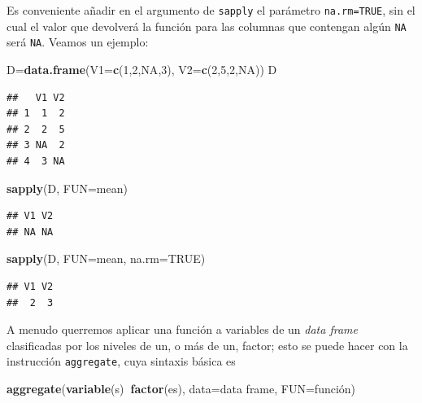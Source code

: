 \documentclass[]{book}
\newenvironment{Shaded}{\begin{snugshade}}{\end{snugshade}}
\newcommand{\DataTypeTok}[1]{\textcolor[rgb]{0.13,0.29,0.53}{#1}}
\newcommand{\DecValTok}[1]{\textcolor[rgb]{0.00,0.00,0.81}{#1}}
\newcommand{\KeywordTok}[1]{\textcolor[rgb]{0.13,0.29,0.53}{\textbf{#1}}}
\newcommand{\NormalTok}[1]{#1}
\newcommand{\OperatorTok}[1]{\textcolor[rgb]{0.81,0.36,0.00}{\textbf{#1}}}
\newcommand{\OtherTok}[1]{\textcolor[rgb]{0.56,0.35,0.01}{#1}}
\theoremstyle{definition}
\theoremstyle{definition}
\theoremstyle{definition}
\theoremstyle{remark}
\begin{document}
Es conveniente añadir en el argumento de \texttt{sapply} el parámetro \texttt{na.rm=TRUE}, sin el cual el valor que devolverá la función para las columnas que contengan algún \texttt{NA} será \texttt{NA}. Veamos un ejemplo:

\begin{Shaded}
\begin{Highlighting}[]
\NormalTok{D=}\KeywordTok{data.frame}\NormalTok{(}\DataTypeTok{V1=}\KeywordTok{c}\NormalTok{(}\DecValTok{1}\NormalTok{,}\DecValTok{2}\NormalTok{,}\OtherTok{NA}\NormalTok{,}\DecValTok{3}\NormalTok{), }\DataTypeTok{V2=}\KeywordTok{c}\NormalTok{(}\DecValTok{2}\NormalTok{,}\DecValTok{5}\NormalTok{,}\DecValTok{2}\NormalTok{,}\OtherTok{NA}\NormalTok{))}
\NormalTok{D}
\end{Highlighting}
\end{Shaded}

\begin{verbatim}
##   V1 V2
## 1  1  2
## 2  2  5
## 3 NA  2
## 4  3 NA
\end{verbatim}

\begin{Shaded}
\begin{Highlighting}[]
\KeywordTok{sapply}\NormalTok{(D, }\DataTypeTok{FUN=}\NormalTok{mean)}
\end{Highlighting}
\end{Shaded}

\begin{verbatim}
## V1 V2 
## NA NA
\end{verbatim}

\begin{Shaded}
\begin{Highlighting}[]
\KeywordTok{sapply}\NormalTok{(D, }\DataTypeTok{FUN=}\NormalTok{mean, }\DataTypeTok{na.rm=}\OtherTok{TRUE}\NormalTok{)}
\end{Highlighting}
\end{Shaded}

\begin{verbatim}
## V1 V2 
##  2  3
\end{verbatim}

A menudo querremos aplicar una función a variables de un \emph{data frame} clasificadas por los niveles de un, o más de un, factor; esto se puede hacer con la instrucción \texttt{aggregate}, cuya sintaxis básica es

\begin{Shaded}
\begin{Highlighting}[]
\KeywordTok{aggregate}\NormalTok{(}\KeywordTok{variable}\NormalTok{(s)}\OperatorTok{~}\KeywordTok{factor}\NormalTok{(es), }\DataTypeTok{data=}\NormalTok{data frame, }\DataTypeTok{FUN=}\NormalTok{función)}
\end{Highlighting}
\end{Shaded}
\end{document}
